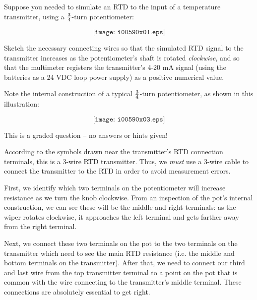 

Suppose you needed to simulate an RTD to the input of a temperature transmitter, using a $3 \over 4$-turn potentiometer:

$$\texttt{[image: i00590x01.eps]}$$

Sketch the necessary connecting wires so that the simulated RTD signal to the transmitter increases as the potentiometer's shaft is rotated {\it clockwise}, and so that the multimeter registers the transmitter's 4-20 mA signal (using the batteries as a 24 VDC loop power supply) as a positive numerical value.

\vskip 10pt

Note the internal construction of a typical $3 \over 4$-turn potentiometer, as shown in this illustration:

$$\texttt{[image: i00590x03.eps]}$$

\vfil 

\eject






This is a graded question -- no answers or hints given!







According to the symbols drawn near the transmitter's RTD connection terminals, this is a 3-wire RTD transmitter.  Thus, we {\it must} use a 3-wire cable to connect the transmitter to the RTD in order to avoid measurement errors.

\vskip 10pt

First, we identify which two terminals on the potentiometer will increase resistance as we turn the knob clockwise.  From an inspection of the pot's internal construction, we can see these will be the middle and right terminals: as the wiper rotates clockwise, it approaches the left terminal and gets farther away from the right terminal.

\vskip 10pt

Next, we connect these two terminals on the pot to the two terminals on the transmitter which need to see the main RTD resistance (i.e. the middle and bottom terminals on the transmitter).  After that, we need to connect our third and last wire from the top transmitter terminal to a point on the pot that is common with the wire connecting to the transmitter's middle terminal.  These connections are absolutely essential to get right.

